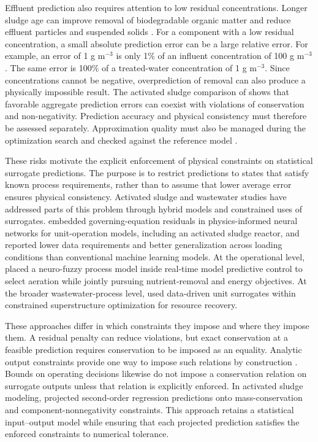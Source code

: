 \documentclass[a4paper,fleqn]{cas-sc}
\begin{document}
Effluent prediction also requires attention to low residual concentrations. Longer sludge age can improve removal of biodegradable organic matter and reduce effluent particles and suspended solids \citep{Leu2012}. For a component with a low residual concentration, a small absolute prediction error can be a large relative error. For example, an error of 1 g m$^{-3}$ is only 1\% of an influent concentration of 100 g m$^{-3}$. The same error is 100\% of a treated-water concentration of 1 g m$^{-3}$. Since concentrations cannot be negative, overprediction of removal can also produce a physically impossible result. The activated sludge comparison of \citet{Selerio2026} shows that favorable aggregate prediction errors can coexist with violations of conservation and non-negativity. Prediction accuracy and physical consistency must therefore be assessed separately. Approximation quality must also be managed during the optimization search and checked against the reference model \citep{Alexandrov1998,Bhosekar2018}.

These risks motivate the explicit enforcement of physical constraints on statistical surrogate predictions. The purpose is to restrict predictions to states that satisfy known process requirements, rather than to assume that lower average error ensures physical consistency. Activated sludge and wastewater studies have addressed parts of this problem through hybrid models and constrained uses of surrogates. \citet{Li2024} embedded governing-equation residuals in physics-informed neural networks for unit-operation models, including an activated sludge reactor, and reported lower data requirements and better generalization across loading conditions than conventional machine learning models. At the operational level, \citet{Bernardelli2020} placed a neuro-fuzzy process model inside real-time model predictive control to select aeration while jointly pursuing nutrient-removal and energy objectives. At the broader wastewater-process level, \citet{Durkin2024} used data-driven unit surrogates within constrained superstructure optimization for resource recovery.

These approaches differ in which constraints they impose and where they impose them. A residual penalty can reduce violations, but exact conservation at a feasible prediction requires conservation to be imposed as an equality. Analytic output constraints provide one way to impose such relations by construction \citep{Beucler2021}. Bounds on operating decisions likewise do not impose a conservation relation on surrogate outputs unless that relation is explicitly enforced. In activated sludge modeling, \citet{Selerio2026} projected second-order regression predictions onto mass-conservation and component-nonnegativity constraints. This approach retains a statistical input--output model while ensuring that each projected prediction satisfies the enforced constraints to numerical tolerance.
\end{document}
